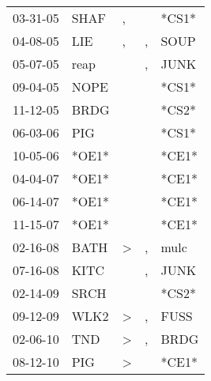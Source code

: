 \begin{supertabular}{p{0.07\textwidth}p{0.06\textwidth}p{0.02\textwidth}p{0.02\textwidth}p{0.06\textwidth}}
 03-31-05\textsuperscript{} &  SHAF\textsuperscript{} &             , &               &                   *CS1* \\
 04-08-05\textsuperscript{} &   LIE\textsuperscript{} &             , &             , &  SOUP\textsuperscript{} \\
 05-07-05\textsuperscript{} &  reap\textsuperscript{} &               &             , &  JUNK\textsuperscript{} \\
 09-04-05\textsuperscript{} &  NOPE\textsuperscript{} &               &               &                   *CS1* \\
 11-12-05\textsuperscript{} &  BRDG\textsuperscript{} &               &               &                   *CS2* \\
 06-03-06\textsuperscript{} &   PIG\textsuperscript{} &               &               &                   *CS1* \\
 10-05-06\textsuperscript{} &                   *OE1* &               &               &                   *CE1* \\
 04-04-07\textsuperscript{} &                   *OE1* &               &               &                   *CE1* \\
 06-14-07\textsuperscript{} &                   *OE1* &               &               &                   *CE1* \\
 11-15-07\textsuperscript{} &                   *OE1* &               &               &                   *CE1* \\
 02-16-08\textsuperscript{} &  BATH\textsuperscript{} &  \textgreater &             , &  mulc\textsuperscript{} \\
 07-16-08\textsuperscript{} &  KITC\textsuperscript{} &               &             , &  JUNK\textsuperscript{} \\
 02-14-09\textsuperscript{} &  SRCH\textsuperscript{} &               &               &                   *CS2* \\
 09-12-09\textsuperscript{} &  WLK2\textsuperscript{} &  \textgreater &             , &  FUSS\textsuperscript{} \\
 02-06-10\textsuperscript{} &   TND\textsuperscript{} &  \textgreater &             , &  BRDG\textsuperscript{} \\
 08-12-10\textsuperscript{} &   PIG\textsuperscript{} &  \textgreater &               &                   *CE1* \\

\end{supertabular}
